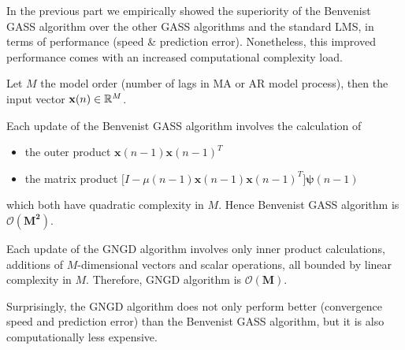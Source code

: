 \begin{enumerate}[label=\alph*), leftmargin=*]
In the previous part we empirically showed the superiority of the Benvenist GASS algorithm over the other GASS algorithms and the standard LMS, in terms of performance (speed \& prediction error).
Nonetheless, this improved performance comes with an increased computational complexity load.

Let $M$ the model order (number of lags in MA or AR model process), then the input vector $\mathbf{x}(n) \in {\mathbb{R}}^{M}$.

Each update of the Benvenist GASS algorithm involves the calculation of 
\begin{itemize}
    \item the outer product $\mathbf{x}(n-1) \mathbf{x}(n-1)^{T}$
    \item the matrix product $\big[I - \mu(n-1) \mathbf{x}(n-1) \mathbf{x}(n-1)^{T} \big] \boldsymbol{\psi}(n - 1)$
\end{itemize}

which both have quadratic complexity in $M$. Hence Benvenist GASS algorithm is $\mathbf{\mathcal{O}(M^{2})}$.

Each update of the GNGD algorithm involves only inner product calculations, additions of $M$-dimensional vectors and scalar operations, all bounded by linear complexity in $M$.
Therefore, GNGD algorithm is $\mathbf{\mathcal{O}(M)}$.

Surprisingly, the GNGD algorithm does not only perform better (convergence speed and prediction error) than the Benvenist GASS algorithm, but it is also computationally less expensive.

%
\end{enumerate}